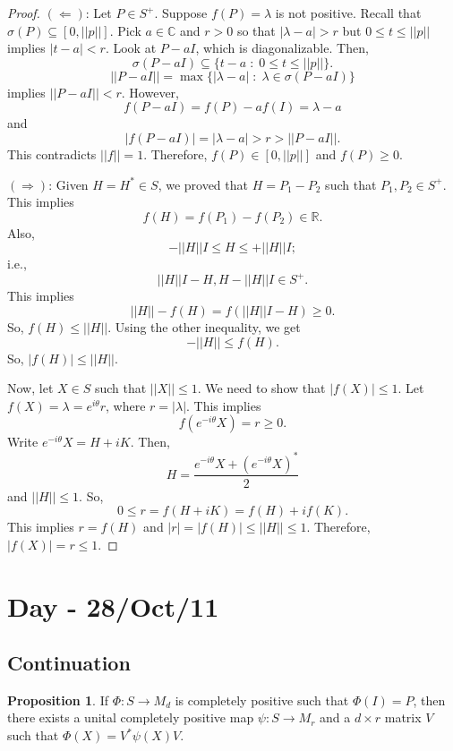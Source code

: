 \documentclass[12pt]{article}
\theoremstyle{definition}
\newtheorem*{proposition}{Proposition}
\newcommand{\C}{\mathbb{C}}
\begin{document}
\begin{proof}
$(\Leftarrow)$: Let $P \in S^+$. Suppose $f(P)=\lambda$ is not positive. Recall that $\sigma(P) \subseteq [0,||p||]$. Pick $a \in \C$ and $r>0$ so that $|\lambda-a|>r$ but $0 \leq t \leq ||p||$ implies $|t-a|<r$. Look at $P-aI$, which is diagonalizable. Then,
\[
\sigma(P-aI) \subseteq \{t-a \;:\; 0 \leq t \leq ||p||\}.
\]
\[
||P-aI|| = \max\{|\lambda-a| \;:\; \lambda \in \sigma(P-aI)\}
\]
implies $||P-aI||<r$. However,
\[
f(P-aI) = f(P)-af(I) = \lambda - a
\]
and
\[
|f(P-aI)| = |\lambda-a| > r > ||P-aI||.
\]
This contradicts $||f||=1$. Therefore, $f(P) \in [0,||p||]$ and $f(P) \geq 0$.

$(\Rightarrow)$: Given $H=H^* \in S$, we proved that $H=P_1-P_2$ such that $P_1,P_2 \in S^+$. This implies
\[
f(H) = f(P_1)-f(P_2) \in \mathbb{R}.
\]
Also,
\[
-||H||I \leq H \leq +||H||I;
\]
i.e.,
\[
||H||I-H, H-||H||I \in S^+.
\]
This implies
\[
||H||-f(H) = f(||H||I-H) \geq 0.
\]
So, $f(H) \leq ||H||$. Using the other inequality, we get
\[
-||H|| \leq f(H).
\]
So, $|f(H)| \leq ||H||$.

Now, let $X \in S$ such that $||X|| \leq 1$. We need to show that $|f(X)| \leq 1$. Let $f(X)=\lambda=e^{i\theta}r$, where $r=|\lambda|$. This implies
\[
f(e^{-i\theta}X) = r \geq 0.
\]
Write $e^{-i\theta}X=H+iK$. Then,
\[
H = \frac{e^{-i\theta}X+(e^{-i\theta}X)^*}{2}
\]
and $||H|| \leq 1$. So,
\[
0 \leq r = f(H+iK) = f(H)+if(K).
\]
This implies $r=f(H)$ and $|r|=|f(H)| \leq ||H|| \leq 1$. Therefore, $|f(X)|=r \leq 1$.
\end{proof}

\section{Day - 28/Oct/11}

\subsection{Continuation}

\begin{proposition}
If $\Phi:S \to M_d$ is completely positive such that $\Phi(I)=P$, then there exists a unital completely positive map $\psi:S \to M_r$ and a $d \times r$ matrix $V$ such that $\Phi(X)=V^*\psi(X)V$.
\end{proposition}
\end{document}
